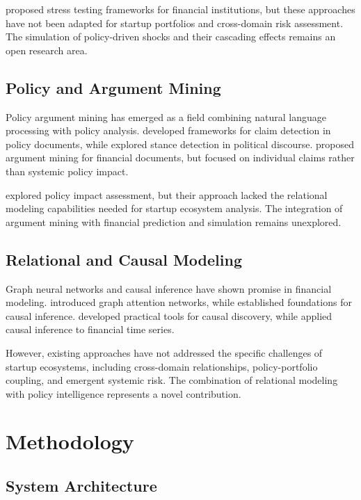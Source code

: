 \cite{allen2010understanding} proposed stress testing frameworks for financial institutions, but these approaches have not been adapted for startup portfolios and cross-domain risk assessment. The simulation of policy-driven shocks and their cascading effects remains an open research area.

\subsection{Policy and Argument Mining}

Policy argument mining has emerged as a field combining natural language processing with policy analysis. \cite{lawrence2019argument} developed frameworks for claim detection in policy documents, while \cite{stede2018argument} explored stance detection in political discourse. \cite{habernal2018argument} proposed argument mining for financial documents, but focused on individual claims rather than systemic policy impact.

\cite{li2020policy} explored policy impact assessment, but their approach lacked the relational modeling capabilities needed for startup ecosystem analysis. The integration of argument mining with financial prediction and simulation remains unexplored.

\subsection{Relational and Causal Modeling}

Graph neural networks and causal inference have shown promise in financial modeling. \cite{velivckovic2017graph} introduced graph attention networks, while \cite{pearl2009causality} established foundations for causal inference. \cite{kalisch2012causal} developed practical tools for causal discovery, while \cite{sharma2019causal} applied causal inference to financial time series.

However, existing approaches have not addressed the specific challenges of startup ecosystems, including cross-domain relationships, policy-portfolio coupling, and emergent systemic risk. The combination of relational modeling with policy intelligence represents a novel contribution.

\section{Methodology}

\subsection{System Architecture}

